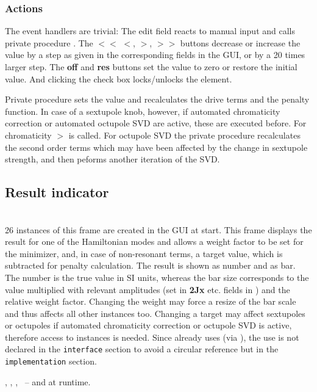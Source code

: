 \documentclass[12pt]{article}
\newcommand\code[1]{{\tt #1}}
\newcommand{\ofld}[1]{\colorbox{black!15}{{{\color{black}\bf #1}}}}
\newcommand\guifco[1]{{\color{violet}\code{#1}}}
\newcommand{\unico}[1]{{\color{burntorange}\code{#1}}}
\newcommand{\prcod}[2]{\opauni{#1}$>$\unico{#2}}
\newcommand{\opagui}[1]{\colorbox{blue!20}{{\color{black}\code{#1}}}}
\newcommand{\ogui}[1]{\hyperref[#1]{\opagui{#1}}}
\newcommand{\opaguif}[1]{\colorbox{violet!30}{{\color{black}\code{#1}}}}
\newcommand{\oguifh}[2]{\subsection{\label{#2}#1}{\Huge\opaguif{#2}}\\}
\newcommand{\oguif}[1]{\hyperref[#1]{\opaguif{#1}}}
\newcommand{\opauni}[1]{\colorbox{orange!30}{{\color{black}\code{#1}}}}
\newcommand{\ouni}[1]{\hyperref[#1]{\opauni{#1}}}
\newcommand{\uses}[1]{\flushleft {\bf Uses:} #1}
\newcommand{\desc}[1]{#1}
\newcommand{\act}[1]{\subsubsection*{Actions} #1}
\begin{document}
\act{
The event handlers are trivial: The edit field reacts to manual input and calls private procedure \guifco{UpdateVal}. The \ofld{$<<$} \ofld{$<$}, \ofld{$>$}, \ofld{$>>$} buttons decrease or increase the value by a step as given in the corresponding fields in the \ogui{opachroma} GUI, or by a 20 times larger step. The \ofld{off} and \ofld{res} buttons set the value to zero or restore the initial value. And clicking the check box locks/unlocks the element.

Private procedure \guifco{UpdateVal} sets the value and recalculates the drive terms and the penalty function. In case of a sextupole knob, however, if automated chromaticity correction or automated octupole SVD are active, these are executed before. For chromaticity \prcod{chromlib}{ChromCorrect} is called. For octupole SVD the private procedure \guifco{OsvdStep} recalculates the second order terms which may have been affected by the change in sextupole strength, and then peforms another iteration of the SVD. 
}


\oguifh{Result indicator}{chamframe} 

\desc{26 instances of this frame are created in the \ogui{opachroma} GUI at start. This frame displays the result for one of the Hamiltonian modes and allows a weight factor to be set for the minimizer, and, in case of non-resonant terms, a target value, which is subtracted for penalty calculation.  The result is shown as number and as bar. The number is the true value in SI units, whereas the bar size corresponds to the value multiplied with relevant amplitudes (set in \ofld{2Jx} etc. fields in \ogui{opachroma}) and the relative weight factor. Changing the weight may force a resize of the bar scale and thus affects all other \oguif{chamframe} instances too. Changing a target may affect sextupoles or octupoles if automated chromaticity correction or octupole SVD is active, therefore access to \oguif{csexframe} instances is needed. Since \oguif{csexframe} already uses \oguif{chamframe} (via \ouni{chromreslib}), the use is not declared in the \code{interface} section to avoid a circular reference but in the \code{implementation} section. 
}

\uses{
\ouni{chromelelib},  \ouni{chromlib}, \ouni{globlib}, \ouni{../com/asaux}~-- and \oguif{csexframe} at runtime.
}
\end{document}

